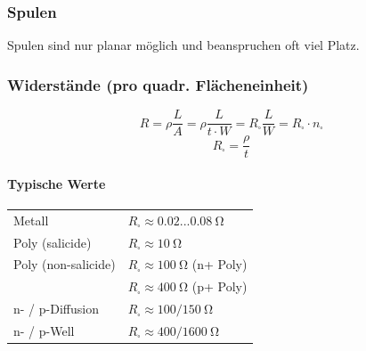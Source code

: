 \subsubsection{Spulen}
Spulen sind nur planar möglich und beanspruchen oft viel Platz.


\subsubsection{Widerstände (pro quadr. Flächeneinheit)}

\begin{minipage}[c]{0.48\columnwidth}
    $$ \boxed{ R = \rho \frac{L}{A} = \rho \frac{L}{t \cdot W} = R_\square \frac{L}{W} = R_\square \cdot n_\square } $$
    $$ \boxed{ R_\square = \frac{\rho}{t} } $$
\end{minipage}
\hfill
\begin{minipage}[c]{0.5\columnwidth}
    \paragraph{Typische Werte}

    \begin{tabular}{@{}l l@{}}
        Metall              & $R_\square \approx 0.02 ... \qty{0.08}{\ohm}$                  \\
        Poly (salicide)     & $R_\square \approx \qty{10}{\ohm}$                             \\
        Poly (non-salicide) & $R_\square \approx \qty{100}{\ohm}$ (n+ Poly)                  \\
                            & $R_\square \approx \qty{400}{\ohm}$ (p+ Poly)                  \\
        n- / p-Diffusion    & $R_\square \approx 100/\qty{150}{\ohm}$                        \\
        n- / p-Well         & $R_\square \approx 400/\qty{1600}{\ohm}$                       \\
    \end{tabular}
\end{minipage}




